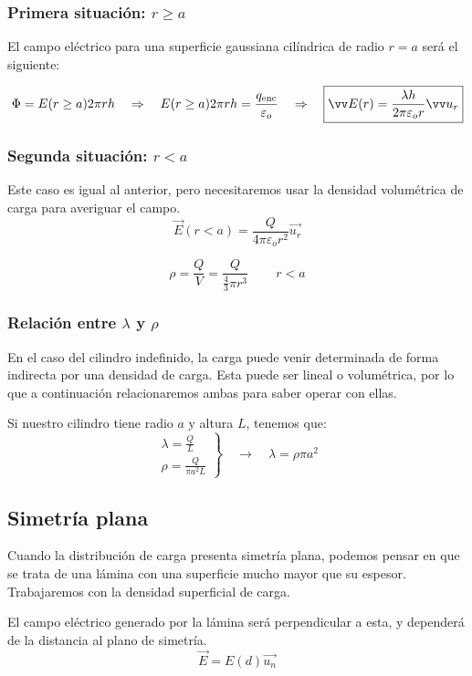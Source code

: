 \documentclass[a4paper]{book}
\begin{document}
\subsubsection{Primera situación: $r\geq a$}
El campo eléctrico para una superficie gaussiana cilíndrica de radio $r=a$ será el siguiente:

\[\Phi = E(r\geq a)2\pi rh \quad \Rightarrow \quad E(r\geq a)2\pi rh=\frac{q\subtext{enc}}{\varepsilon_o} \quad \Rightarrow \quad \boxed{\vec{E}(r) = \frac{\lambda h}{2\pi \varepsilon_o r}\vec{u_r}}\]

\subsubsection{Segunda situación: $r<a$}
Este caso es igual al anterior, pero necesitaremos usar la densidad volumétrica de carga para averiguar el campo.
\[\boxed{\vec{E}\left( r<a \right) = \frac{Q}{4\pi \varepsilon_o r^2}\vec{u_r}}\]

\[\rho = \frac{Q}{V} = \frac{Q}{\frac{4}{3}\pi r^3} \, \qquad r<a\]

\subsubsection{\texorpdfstring{Relación entre $\lambda$ y $\rho$}{Relación entre lambda y rho}}
En el caso del cilindro indefinido, la carga puede venir determinada de forma indirecta por una densidad de carga. Esta puede ser lineal o volumétrica, por lo que a continuación relacionaremos ambas para saber operar con ellas.

Si nuestro cilindro tiene radio $a$ y altura $L$, tenemos que:
\[\left. \begin{matrix}
		\lambda = \frac{Q}{L} \\[5pt]
		\rho = \frac{Q}{\pi a^2 L}
	\end{matrix}\right\} \quad \longrightarrow \quad \boxed{\lambda  = \rho \pi a^2}\]

\subsection{Simetría plana}
Cuando la distribución de carga presenta simetría plana, podemos pensar en que se trata de una lámina con una superficie mucho mayor que su espesor. Trabajaremos con la densidad superficial de carga.

El campo eléctrico generado por la lámina será perpendicular a esta, y dependerá de la distancia al plano de simetría.
\[\vec{E}=E(d)\vec{u_n}\]
\end{document}
